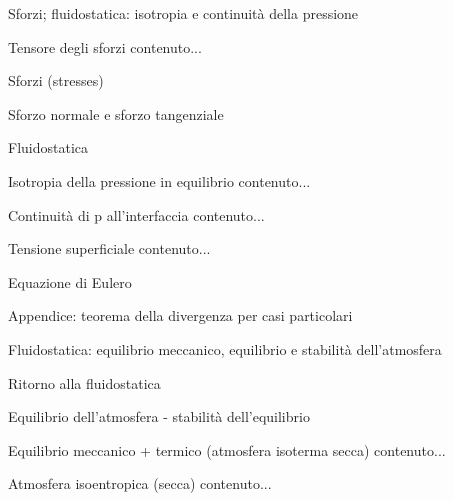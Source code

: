 \documentclass[a4paper,11pt]{report}
\begin{document}
	\begin{chapter}{Sforzi; fluidostatica: isotropia e continuità della pressione}
		\begin{section}{Tensore degli sforzi}
			contenuto...
		\end{section}
		\begin{section}{Sforzi (stresses)}
			\begin{subsection}{Sforzo normale e sforzo tangenziale}
				
			\end{subsection}
		\end{section}
		\begin{section}{Fluidostatica}
			\begin{subsection}{Isotropia della pressione in equilibrio}
				contenuto...
			\end{subsection}
			\begin{subsection}{Continuità di p all'interfaccia}
				contenuto...
			\end{subsection}
			\begin{subsection}{Tensione superficiale}
				contenuto...
			\end{subsection}
		\end{section}
	\end{chapter}

	\begin{chapter}{Equazione di Eulero}
		\begin{section}{Appendice: teorema della divergenza per casi particolari}
		\end{section}
	\end{chapter}

	\begin{chapter}{Fluidostatica: equilibrio meccanico, equilibrio e stabilità dell'atmosfera}
		\begin{section}{Ritorno alla fluidostatica}
		\end{section}
		\begin{section}{Equilibrio dell'atmosfera - stabilità dell'equilibrio}
			\begin{subsection}{Equilibrio meccanico + termico (atmosfera isoterma secca)}
				contenuto...
			\end{subsection}
			\begin{subsection}{Atmosfera isoentropica (secca)}
				contenuto...
			\end{subsection}
		\end{section}
	\end{chapter}
\end{document}
